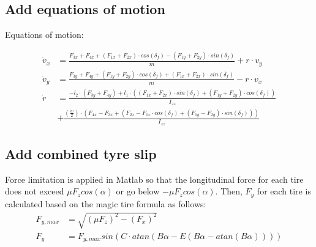 \subsection{Add equations of motion}
Equations of motion:

\begin{align*}
    \Dot v_x &= \frac{F_{3x} + F_{4x} + \left(F_{1x} + F_{2x}\right)\cdot     cos(\delta_f) - \left(F_{1y} + F_{2y}\right)\cdot                    sin(\delta_f)}{m} + r \cdot v_y\\
    \Dot v_y &= \frac{F_{3y} + F_{4y} + \left(F_{1y} + F_{2y}\right)\cdot     cos(\delta_f) + \left(F_{1x} + F_{2x}\right)\cdot                    sin(\delta_f)}{m} - r \cdot v_x\\
    \Dot r &= \frac{-l_2 \cdot \left(F_{3y} + F_{4y}\right)   +   l_1\cdot\left( \left(F_{1x} + F_{2x}\right)\cdot sin(\delta_f) + \left(F_{1y} + F_{2y}\right)\cdot cos(\delta_f) \right)}{I_{zz}}    \\ & + \frac{ \left( \frac{w}{2} \right)\cdot \left( 
F_{4x}-F_{3x} + \left( F_{2x}-F_{1x} \cdot cos(\delta_f) + \left( F_{1y}-F_{2y} \right)\cdot sin(\delta_f) \right)
\right)}{I_{zz}}
\end{align*}


\subsection{Add combined tyre slip}
Force limitation is applied in Matlab so that the longitudinal force for each tire does not exceed $\mu F_z cos(\alpha)$ or go below $-\mu F_z cos(\alpha)$. Then, $F_y$ for each tire is calculated based on the magic tire formula as follows:
\begin{align*}
    F_{y,max} &= \sqrt{(\mu F_z)^2-(F_x)^2}\\
    F_y &= F_{y,max} sin\left( C \cdot atan \left( B \alpha - E \left(B \alpha - atan \left(B \alpha \right)\right)\right)\right)
\end{align*}


